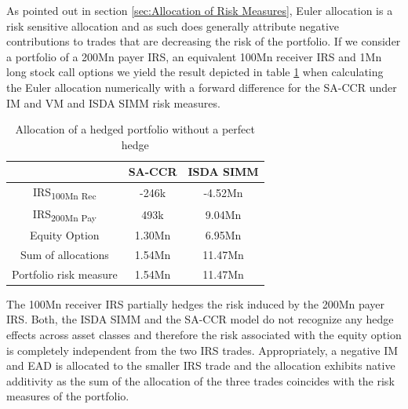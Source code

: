 \documentclass[../Thesis_AHoecherl.tex]{subfiles}
\begin{document}
    As pointed out in section \ref{sec:Allocation of Risk Measures}, Euler allocation is a risk sensitive allocation and as such does generally attribute negative contributions to trades that are decreasing the risk of the portfolio. If we consider a portfolio of a 200Mn payer \gls{IRS}, an equivalent 100Mn receiver \gls{IRS} and 1Mn long stock call options we yield the result depicted in table \ref{tab:hedge trade sample results} when calculating the Euler allocation numerically with a forward difference for the \gls{SA-CCR} under \gls{IM} and \gls{VM} and \gls{ISDA SIMM} risk measures.
    \begin{table}[htbp]
        \centering
        \begin{tabular}{c|c|c}
            & \gls{SA-CCR} & \gls{ISDA SIMM} \\
            \toprule
            IRS\textsubscript{100Mn Rec} & -246k & -4.52Mn \\
            \midrule
            IRS\textsubscript{200Mn Pay} & 493k & 9.04Mn \\
            \midrule
            Equity Option & 1.30Mn & 6.95Mn \\
            \bottomrule
            Sum of allocations & 1.54Mn & 11.47Mn \\
            \midrule
            Portfolio risk measure & 1.54Mn & 11.47Mn \\
        \end{tabular}%
        \caption{Allocation of a hedged portfolio without a perfect hedge}
        \label{tab:hedge trade sample results}
    \end{table}
    The 100Mn receiver \gls{IRS} partially hedges the risk induced by the 200Mn payer \gls{IRS}. 
    Both, the \gls{ISDA SIMM} and the \gls{SA-CCR} model do not recognize any hedge effects across asset classes and therefore the risk associated with the equity option is completely independent from the two \gls{IRS} trades. 
    Appropriately, a negative \gls{IM} and \gls{EAD} is allocated to the smaller \gls{IRS} trade and the allocation exhibits native additivity as the sum of the allocation of the three trades coincides with the risk measures of the portfolio.
    
\end{document}
